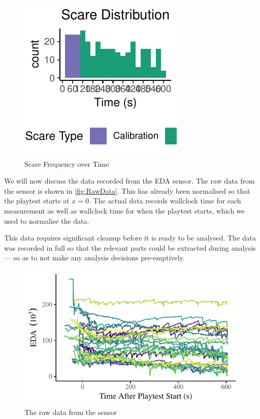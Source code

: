 \documentclass[12pt,a4paper]{article}\usepackage[]{graphicx}\usepackage[]{color}
\makeatletter
\def\maxwidth{ %
  \ifdim\Gin@nat@width>\linewidth
    \linewidth
  \else
    \Gin@nat@width
  \fi
}
\makeatother
\begin{document}
\begin{figure}[htb]


{\centering \includegraphics[width=\maxwidth]{figure/ScareHistogram-1} 

}



\caption{Scare Frequency over Time}
\label{fig:ScareHistogram}
\end{figure}

We will now discuss the data recorded from the EDA sensor.
The raw data from the sensor is shown in \vref{fig:RawData}.
This has already been normalised so that the playtest starts at $x=0$.
The actual data records wallclock time for each measurement as well as wallclock time for when the playtest starts, which we used to normalise the data.

This data requires significant cleanup before it is ready to be analysed.
The data was recorded in full so that the relevant parts could be extracted during analysis --- so as to not make any analysis decisions pre-emptively.

\begin{figure}[htb]


{\centering \includegraphics[width=\maxwidth]{figure/RawData-1} 

}



\caption{The raw data from the sensor}
\label{fig:RawData}
\end{figure}
\end{document}
